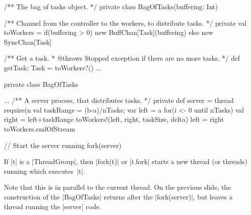 
\begin{slide}

\begin{scala}
  /** The bag of tasks object. */
  private class BagOfTasks(buffering: Int){
    /** Channel from the controller to the workers, to distribute tasks. */
    private val toWorkers = 
      if(buffering > 0) new BuffChan[Task](buffering) else new SyncChan[Task]

    /** Get a task.  
      * @throws Stopped exception if there are no more tasks. */
    def getTask: Task = toWorkers?()
    ...
  }
\end{scala}
\end{slide}  


\begin{slide}

\begin{scala}
  private class BagOfTasks{
    ...
    /** A server process, that distributes tasks. */
    private def server = thread{
      require(n%
      val taskRange = (b-a)/nTasks; var left = a                  
      for(i <- 0 until nTasks){
        val right = left+taskRange
        toWorkers!(left, right, taskSize, delta)
        left = right
      }
      toWorkers.endOfStream
    }

    // Start the server running
    fork(server)
  }
\end{scala}
\end{slide}  


\begin{slide}

If |t| is a |ThreadGroup|, then |fork(t)| or |t.fork| starts a new thread (or
threads) running which executes~|t|.

Note that this is in parallel to the current thread.  On the previous slide,
the construction of the |BagOfTasks| returns after the |fork(server)|, but
leaves a thread running the |server| code. 
\end{slide}



